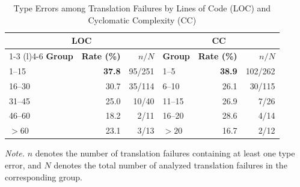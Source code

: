 \begin{table}[t]
\centering
\caption{Type Errors among Translation Failures by Lines of Code (LOC) and Cyclomatic Complexity (CC)}
\label{tab:type-error-metric-groups}
\small
\setlength{\tabcolsep}{5pt}
\begin{tabular}{@{}lrr@{\hspace{1.5em}}lrr@{}}
\toprule
\multicolumn{3}{c}{\textbf{LOC}}
&
\multicolumn{3}{c}{\textbf{CC}} \\
\cmidrule(r){1-3}
\cmidrule(l){4-6}
\textbf{Group}
& \textbf{Rate (\%)}
& \textbf{$n/N$}
& \textbf{Group}
& \textbf{Rate (\%)}
& \textbf{$n/N$} \\
\midrule
1--15  & \textbf{37.8} & 95/251 & 1--5  & \textbf{38.9} & 102/262 \\
16--30 & 30.7 & 35/114 & 6--10 & 26.1 & 30/115  \\
31--45 & 25.0 & 10/40  & 11--15 & 26.9 & 7/26   \\
46--60 & 18.2 & 2/11   & 16--20 & 28.6 & 4/14   \\
$>60$  & 23.1 & 3/13   & $>20$  & 16.7 & 2/12   \\
\bottomrule
\end{tabular}
\vspace{2pt}
\begin{minipage}{0.96\linewidth}
\footnotesize
\textit{Note.} $n$ denotes the number of translation failures
containing at least one type error, and $N$ denotes the total number
of analyzed translation failures in the corresponding group.
\end{minipage}
\end{table}
